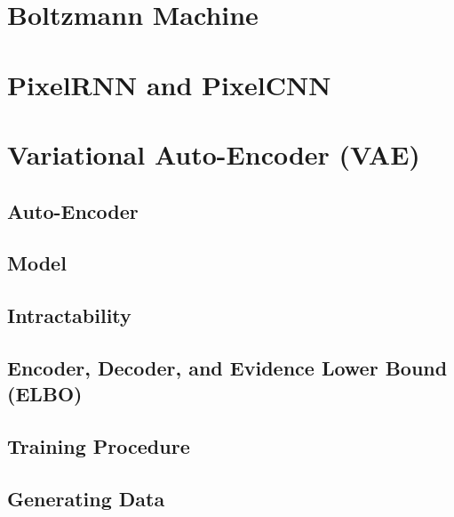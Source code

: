 	\section{Boltzmann Machine} %

	\section{PixelRNN and PixelCNN} %

	\section{Variational Auto-Encoder (VAE)} %

		\subsection{Auto-Encoder} %

		\subsection{Model} %

		\subsection{Intractability} %

		\subsection{Encoder, Decoder, and Evidence Lower Bound (ELBO)} %

		\subsection{Training Procedure} %

		\subsection{Generating Data} %

